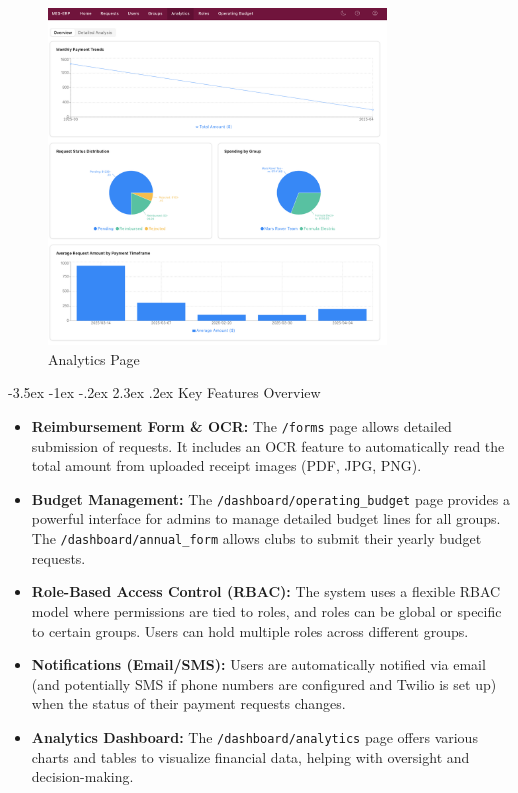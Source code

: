 \documentclass{article}
\makeatletter
\renewcommand \section{\clearpage\@startsection {section}{1}{\z@}%
                                   {-3.5ex \@plus -1ex \@minus -.2ex}%
                                   {2.3ex \@plus.2ex}%
                                   {\normalfont\Large\bfseries}}
\makeatother
\begin{document}
\begin{figure}[H]
    \centering
    \includegraphics[width=0.8\textwidth]{analytics.png}
    \caption{Analytics Page}
\end{figure}

\clearpage
\section{Key Features Overview}

\begin{itemize}
    \item \textbf{Reimbursement Form \& OCR:} The \texttt{/forms} page allows detailed submission of requests. It includes an OCR feature to automatically read the total amount from uploaded receipt images (PDF, JPG, PNG).
    \item \textbf{Budget Management:} The \texttt{/dashboard/operating\_budget} page provides a powerful interface for admins to manage detailed budget lines for all groups. The \texttt{/dashboard/annual\_form} allows clubs to submit their yearly budget requests.
    \item \textbf{Role-Based Access Control (RBAC):} The system uses a flexible RBAC model where permissions are tied to roles, and roles can be global or specific to certain groups. Users can hold multiple roles across different groups.
    \item \textbf{Notifications (Email/SMS):} Users are automatically notified via email (and potentially SMS if phone numbers are configured and Twilio is set up) when the status of their payment requests changes.
    \item \textbf{Analytics Dashboard:} The \texttt{/dashboard/analytics} page offers various charts and tables to visualize financial data, helping with oversight and decision-making.
\end{itemize}
\end{document}
